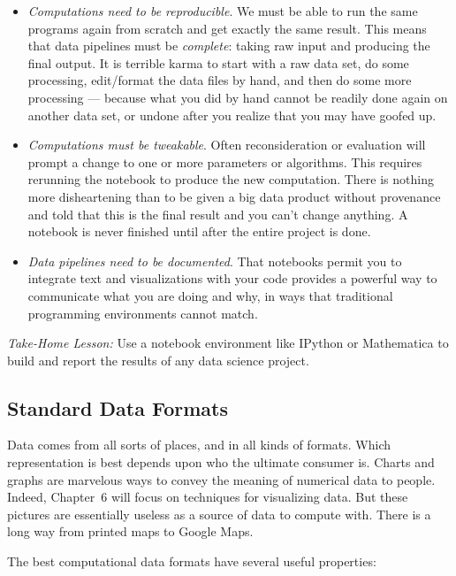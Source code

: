 \documentclass[10pt]{article}
\begin{document}
\begin{itemize}
  \item \textit{Computations need to be reproducible}. We must be able to run the same programs again from scratch and get exactly the same result. This means that data pipelines must be \textit{complete}: taking raw input and producing the final output. It is terrible karma to start with a raw data set, do some processing, edit/format the data files by hand, and then do some more processing — because what you did by hand cannot be readily done again on another data set, or undone after you realize that you may have goofed up.
  \item \textit{Computations must be tweakable}. Often reconsideration or evaluation will prompt a change to one or more parameters or algorithms. This requires rerunning the notebook to produce the new computation. There is nothing more disheartening than to be given a big data product without provenance and told that this is the final result and you can't change anything. A notebook is never finished until after the entire project is done.
  \item \textit{Data pipelines need to be documented}. That notebooks permit you to integrate text and visualizations with your code provides a powerful way to communicate what you are doing and why, in ways that traditional programming environments cannot match.
\end{itemize}

\textit{Take-Home Lesson:} Use a notebook environment like IPython or Mathematica to build and report the results of any data science project.

\subsection*{Standard Data Formats}
Data comes from all sorts of places, and in all kinds of formats. Which representation is best depends upon who the ultimate consumer is. Charts and graphs are marvelous ways to convey the meaning of numerical data to people. Indeed, Chapter~6 will focus on techniques for visualizing data. But these pictures are essentially useless as a source of data to compute with. There is a long way from printed maps to Google Maps.

The best computational data formats have several useful properties:
\end{document}
